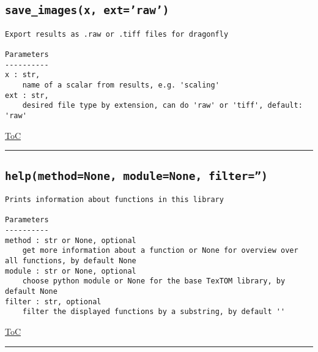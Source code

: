 \documentclass{article}
\begin{document}
\subsection*{\texttt{save\_images(x, ext='raw')}}
\label{fun:saveimages}

\begin{lstlisting}[language=docstring]
Export results as .raw or .tiff files for dragonfly

Parameters
----------
x : str,
    name of a scalar from results, e.g. 'scaling'
ext : str,
    desired file type by extension, can do 'raw' or 'tiff', default: 'raw'
\end{lstlisting}

\begin{flushright}

\hyperref[toc]{ToC}

\end{flushright}



\vspace{5mm}

\hrule

\subsection*{\texttt{help(method=None, module=None, filter='')}}
\label{fun:help}

\begin{lstlisting}[language=docstring]
Prints information about functions in this library

Parameters
----------
method : str or None, optional
    get more information about a function or None for overview over all functions, by default None
module : str or None, optional
    choose python module or None for the base TexTOM library, by default None
filter : str, optional
    filter the displayed functions by a substring, by default ''
\end{lstlisting}

\begin{flushright}

\hyperref[toc]{ToC}

\end{flushright}



\vspace{5mm}

\hrule
\end{document}
